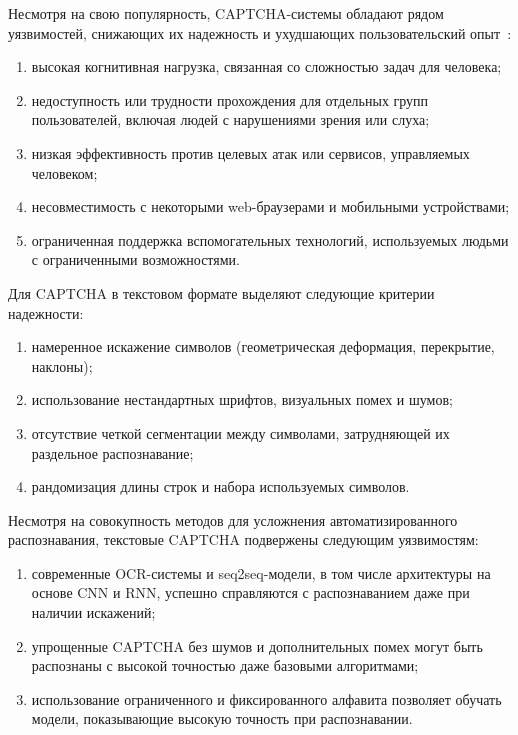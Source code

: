 Несмотря на свою популярность, CAPTCHA-системы обладают рядом уязвимостей, 
снижающих их надежность и ухудшающих пользовательский опыт~\cite{captchatrouble, 
captchatrouble2}:

\begin{enumerate}
    \item высокая когнитивная нагрузка, связанная со сложностью задач для 
    человека;
    \item недоступность или трудности прохождения для отдельных групп 
    пользователей, включая людей с нарушениями зрения или слуха;
    \item низкая эффективность против целевых атак или сервисов, управляемых 
    человеком;
    \item несовместимость с некоторыми web-браузерами и мобильными устройствами;
    \item ограниченная поддержка вспомогательных технологий, используемых людьми 
    с ограниченными возможностями.
\end{enumerate}

Для CAPTCHA в текстовом формате выделяют следующие критерии надежности:

\begin{enumerate}
    \item намеренное искажение символов (геометрическая деформация, 
    перекрытие, наклоны);
    \item использование нестандартных шрифтов, визуальных помех и шумов;
    \item отсутствие четкой сегментации между символами, затрудняющей их 
    раздельное распознавание;
    \item рандомизация длины строк и набора используемых символов.
\end{enumerate}

Несмотря на совокупность методов для усложнения автоматизированного 
распознавания, текстовые CAPTCHA подвержены следующим уязвимостям:

\begin{enumerate}
    \item современные OCR-системы и seq2seq-модели, в том числе архитектуры на 
    основе CNN и RNN, успешно справляются с распознаванием даже при наличии 
    искажений;
    \item упрощенные CAPTCHA без шумов и дополнительных помех могут быть 
    распознаны с высокой точностью даже базовыми алгоритмами;
    \item использование ограниченного и фиксированного алфавита позволяет обучать 
    модели, показывающие высокую точность при распознавании.
\end{enumerate}

